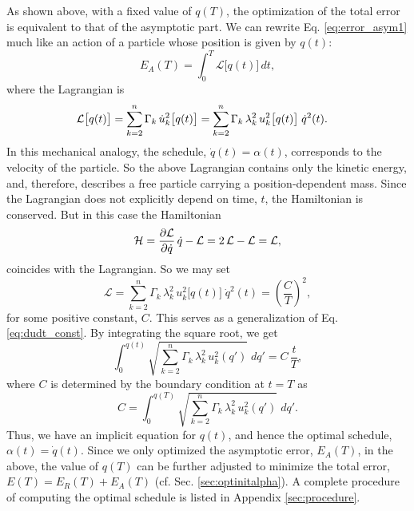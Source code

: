 \documentclass[reprint, superscriptaddress, floatfix]{revtex4-1}
\newcommand{\Err}{E}
\begin{document}
As shown above, with a fixed value of $q(T)$,
the optimization of the total error is equivalent to
that of the asymptotic part.
%
We can rewrite Eq. \eqref{eq:error_asym1} much like an action
of a particle whose position is given by $q(t)$:
%
\begin{equation}
  \Err_A(T)
  =
  \int_0^T
    {\mathcal L} \bigl[ q(t)\bigr]
    \, dt
  ,
\label{eq:error_asym_Lagrangian}
\end{equation}
%
where the Lagrangian is
%
\begin{align}
  {\mathcal L} \bigl[ q(t) \bigr]
  &=
  \sum_{ k = 2 }^n
    \Gamma_k \, \dot u_k^2\bigl[ q(t) \bigr]
  =
  \sum_{ k = 2 }^n
    \Gamma_k \, \lambda_k^2 \, u_k^2 \bigl[ q(t) \bigr]
  \; \dot q^2( t )
  .
\notag
\end{align}
%
In this mechanical analogy,
the schedule, $\dot q(t) = \alpha(t)$,
corresponds to the velocity of the particle.
%
So the above Lagrangian contains only the kinetic energy,
and, therefore, describes a free particle
carrying a position-dependent mass.
%
Since the Lagrangian
does not explicitly depend on time, $t$,
the Hamiltonian is conserved.
%
But in this case the Hamiltonian
%
\begin{equation}
  \mathcal H
  =
  \frac{ \partial \mathcal L }
       { \partial \dot q     }
  \, \dot q
  -
  \mathcal L
  =
  2 \, \mathcal L
  - \mathcal L
  =
  \mathcal L,
  \notag
\end{equation}
%
coincides with the Lagrangian.
%
So we may set
%
\begin{equation}
  \mathcal L
  =
    \sum_{ k = 2 }^n
      \Gamma_k \, \lambda_k^2
      \, u_k^2 \bigl[ q(t) \bigr]
  \;
  \dot q^2(t)
  =
  \left(
    \frac{C}{T}
  \right)^2
  ,
  \label{eq:Lagrangian_const}
\end{equation}
%
for some positive constant, $C$.
%
This serves
as a generalization of Eq. \eqref{eq:dudt_const}.
%
By integrating the square root, we get
%
\begin{equation}
  \int_{ 0 }^{ q(t) }
    \sqrt{
      \textstyle\sum_{ k = 2 }^n
        \Gamma_k \, \lambda_k^2
        \, u_k^2( q' )
    }
    \;
    d q'
  =
  C \, \frac t T
  ,
  \label{eq:q_opt}
\end{equation}
%
where $C$ is determined by
the boundary condition at $t = T$ as
%
\begin{equation}
  C =
  \int_{ 0 }^{ q(T) }
    \sqrt{
      \textstyle\sum_{ k = 2 }^n
        \Gamma_k \, \lambda_k^2
        \, u_k^2( q' )
    }
    \;
    d q'
  .
  \label{eq:mint}
\end{equation}
%
Thus, we have an implicit equation for $q(t)$,
and hence the optimal schedule,
$\alpha(t) = \dot q(t)$.
%
Since we only optimized the asymptotic error, $\Err_A(T)$,
in the above,
the value of $q(T)$ can be further adjusted
to minimize the total error, $\Err(T) = \Err_R(T) + \Err_A(T)$
(cf. Sec. \ref{sec:optinitalpha}).
%
A complete procedure of computing the optimal schedule
is listed in Appendix \ref{sec:procedure}.
\end{document}
